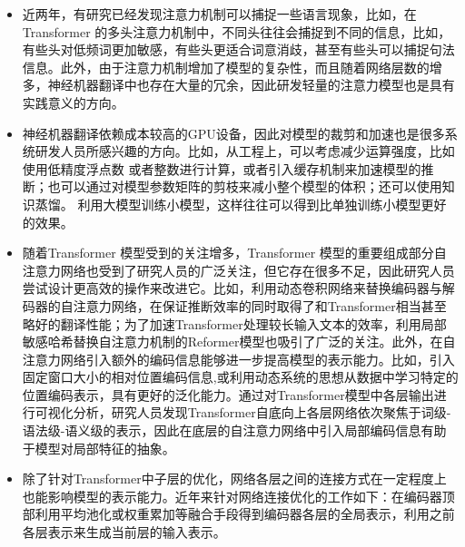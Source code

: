 \begin{itemize}
\vspace{0.5em}
\item 近两年，有研究已经发现注意力机制可以捕捉一些语言现象，比如，在Transformer 的多头注意力机制中，不同头往往会捕捉到不同的信息，比如，有些头对低频词更加敏感，有些头更适合词意消歧，甚至有些头可以捕捉句法信息。此外，由于注意力机制增加了模型的复杂性，而且随着网络层数的增多，神经机器翻译中也存在大量的冗余，因此研发轻量的注意力模型也是具有实践意义的方向。

\vspace{0.5em}
\item 神经机器翻译依赖成本较高的GPU设备，因此对模型的裁剪和加速也是很多系统研发人员所感兴趣的方向。比如，从工程上，可以考虑减少运算强度，比如使用低精度浮点数 或者整数进行计算，或者引入缓存机制来加速模型的推断；也可以通过对模型参数矩阵的剪枝来减小整个模型的体积；还可以使用知识蒸馏。 利用大模型训练小模型，这样往往可以得到比单独训练小模型更好的效果。
\vspace{0.5em}
\item 随着Transformer 模型受到的关注增多，Transformer 模型的重要组成部分自注意力网络也受到了研究人员的广泛关注，但它存在很多不足，因此研究人员尝试设计更高效的操作来改进它。比如，利用动态卷积网络来替换编码器与解码器的自注意力网络，在保证推断效率的同时取得了和Transformer相当甚至略好的翻译性能；为了加速Transformer处理较长输入文本的效率，利用局部敏感哈希替换自注意力机制的Reformer模型也吸引了广泛的关注。此外，在自注意力网络引入额外的编码信息能够进一步提高模型的表示能力。比如，引入固定窗口大小的相对位置编码信息,或利用动态系统的思想从数据中学习特定的位置编码表示，具有更好的泛化能力。通过对Transformer模型中各层输出进行可视化分析，研究人员发现Transformer自底向上各层网络依次聚焦于词级-语法级-语义级的表示，因此在底层的自注意力网络中引入局部编码信息有助于模型对局部特征的抽象。
\vspace{0.5em}
\item 除了针对Transformer中子层的优化，网络各层之间的连接方式在一定程度上也能影响模型的表示能力。近年来针对网络连接优化的工作如下：在编码器顶部利用平均池化或权重累加等融合手段得到编码器各层的全局表示，利用之前各层表示来生成当前层的输入表示。
\end{itemize}
